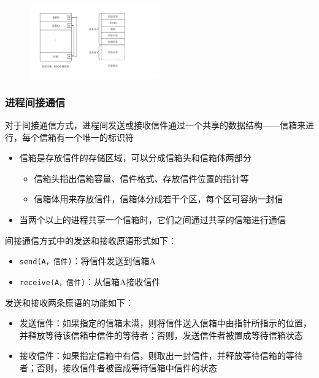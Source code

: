 \documentclass[cs4size,a4paper,10pt]{ctexart}
\begin{document}
	\begin{figure}[H]
		\centering
		\includegraphics[width=0.5\textwidth]{img/进程直接传递和消息格式.pdf}
	\end{figure}
	
	\subsubsection{进程间接通信}
	对于间接通信方式，进程间发送或接收信件通过一个共享的数据结构——信箱来进行，每个信箱有一个唯一的标识符
	\begin{itemize}
		\item 信箱是存放信件的存储区域，可以分成信箱头和信箱体两部分
		\begin{itemize}
			\item 信箱头指出信箱容量、信件格式、存放信件位置的指针等
			\item 信箱体用来存放信件，信箱体分成若干个区，每个区可容纳一封信
		\end{itemize}
		\item 当两个以上的进程共享一个信箱时，它们之间通过共享的信箱进行通信
	\end{itemize}

	间接通信方式中的发送和接收原语形式如下：
	\begin{itemize}
		\item \verb|send(A，信件)|：将信件发送到信箱A
		\item \verb|receive(A，信件)|：从信箱A接收信件
	\end{itemize}

	发送和接收两条原语的功能如下：
	\begin{itemize}
		\item 发送信件：如果指定的信箱末满，则将信件送入信箱中由指针所指示的位置，并释放等待该信箱中信件的等待者；否则，发送信件者被置成等待信箱状态
		\item 接收信件：如果指定信箱中有信，则取出一封信件，并释放等待信箱的等待者；否则，接收信件者被置成等待信箱中信件的状态
	\end{itemize}
\end{document}

